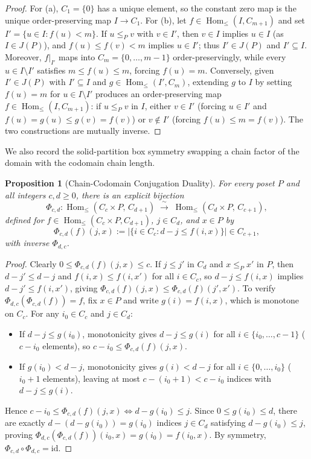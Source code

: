 \documentclass[11pt,a4paper]{article}
\newcommand{\coloneqq}{\mathrel{:=}}
\newtheorem{proposition}[theorem]{Proposition}
\theoremstyle{definition}
\newcommand{\Homle}{\operatorname{Hom}_{\le}}
\begin{document}
\begin{proof}
For (a), $C_1 = \{0\}$ has a unique element, so the constant zero map is the unique order-preserving
map $I \to C_1$. For (b), let $f \in \Homle(I, C_{m+1})$ and set $I' = \{u \in I : f(u) < m\}$. If
$u \le_P v$ with $v \in I'$, then $v \in I$ implies $u \in I$ (as $I \in J(P)$), and $f(u) \le f(v)
< m$ implies $u \in I'$; thus $I' \in J(P)$ and $I' \subseteq I$. Moreover, $f|_{I'}$ maps into
$C_m = \{0, \dots, m-1\}$ order-preservingly, while every $u \in I \setminus I'$ satisfies $m \le
f(u) \le m$, forcing $f(u) = m$. Conversely, given $I' \in J(P)$ with $I' \subseteq I$ and $g \in
\Homle(I', C_m)$, extending $g$ to $I$ by setting $f(u) = m$ for $u \in I \setminus I'$ produces an
order-preserving map $f \in \Homle(I, C_{m+1})$: if $u \le_P v$ in $I$, either $v \in I'$ (forcing
$u \in I'$ and $f(u) = g(u) \le g(v) = f(v)$) or $v \notin I'$ (forcing $f(u) \le m = f(v)$). The
two constructions are mutually inverse.
\end{proof}

We also record the solid-partition box symmetry swapping a chain factor of the domain with the
codomain chain length.

\begin{proposition}[Chain-Codomain Conjugation Duality]\label{prop:box-duality}
For every poset $P$ and all integers $c, d \ge 0$, there is an explicit bijection
\[
  \Phi_{c,d} : \Homle(C_c \times P,\, C_{d+1}) \;\xrightarrow{\;\sim\;}\;
  \Homle(C_d \times P,\, C_{c+1}),
\]
defined for $f \in \Homle(C_c \times P, C_{d+1})$, $j \in C_d$, and $x \in P$ by
\[
  \Phi_{c,d}(f)(j, x) \coloneqq \bigl|\{i \in C_c : d - j \le f(i, x)\}\bigr| \in C_{c+1},
\]
with inverse $\Phi_{d,c}$.
\end{proposition}

\begin{proof}
Clearly $0 \le \Phi_{c,d}(f)(j, x) \le c$. If $j \le j'$ in $C_d$ and $x \le_P x'$ in $P$, then
$d - j' \le d - j$ and $f(i, x) \le f(i, x')$ for all $i \in C_c$, so $d - j \le f(i, x)$ implies
$d - j' \le f(i, x')$, giving $\Phi_{c,d}(f)(j, x) \le \Phi_{c,d}(f)(j', x')$. To verify
$\Phi_{d,c}(\Phi_{c,d}(f)) = f$, fix $x \in P$ and write $g(i) = f(i, x)$, which is monotone on
$C_c$. For any $i_0 \in C_c$ and $j \in C_d$:
\begin{itemize}
  \item If $d - j \le g(i_0)$, monotonicity gives $d - j \le g(i)$ for all $i \in \{i_0, \dots,
        c-1\}$ ($c - i_0$ elements), so $c - i_0 \le \Phi_{c,d}(f)(j, x)$.
  \item If $g(i_0) < d - j$, monotonicity gives $g(i) < d - j$ for all $i \in \{0, \dots, i_0\}$
        ($i_0 + 1$ elements), leaving at most $c - (i_0 + 1) < c - i_0$ indices with $d - j \le
        g(i)$.
\end{itemize}
Hence $c - i_0 \le \Phi_{c,d}(f)(j, x) \iff d - g(i_0) \le j$. Since $0 \le g(i_0) \le d$, there are
exactly $d - (d - g(i_0)) = g(i_0)$ indices $j \in C_d$ satisfying $d - g(i_0) \le j$, proving
$\Phi_{d,c}(\Phi_{c,d}(f))(i_0, x) = g(i_0) = f(i_0, x)$. By symmetry, $\Phi_{c,d} \circ \Phi_{d,c}
= \mathrm{id}$.
\end{proof}
\end{document}
